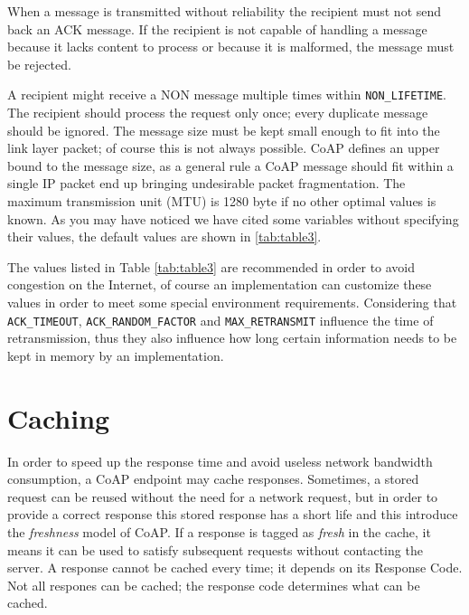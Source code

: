 	When a message is transmitted without reliability the recipient must not send back an ACK message.\newline
	If the recipient is not capable of handling a message because it lacks content to process or because it is malformed, the message must be rejected.\newline
	
	A recipient might receive a NON message multiple times within \texttt{NON\_LIFETIME}.\newline
	The recipient should process the request only once; every duplicate message should be ignored.\newline
	The message size must be kept small enough to fit into the link layer packet; of course this is not always possible.\newline
	CoAP defines an upper bound to the message size, as a general rule a CoAP message should fit within a single IP packet end up bringing undesirable packet fragmentation.\newline
	The maximum transmission unit (MTU) is 1280 byte if no other optimal values is known.\newline
	As you may have noticed we have cited some variables without specifying their values, the default values are shown in \ref{tab:table3}.\newline
	
	

	The values listed in Table \ref{tab:table3} are recommended in order to avoid congestion on the Internet, of course an implementation can customize these values in order to meet some special environment requirements.\newline
	Considering that \texttt{ACK\_TIMEOUT}, \texttt{ACK\_RANDOM\_FACTOR} and \texttt{MAX\_RETRANSMIT} influence the time of retransmission, thus they also influence how long certain information needs to be kept in memory by an implementation.\newline
	
	\section{Caching}\label{sc:caching}
	In order to speed up the response time and avoid useless network bandwidth consumption, a CoAP endpoint may cache responses.\newline
	Sometimes, a stored request can be reused without the need for a network request, but in order to provide a correct response this stored response has a short life and this introduce the \emph{freshness} model of CoAP.\newline
	If a response is tagged as \emph{fresh} in the cache, it means it can be used to satisfy subsequent requests without contacting the server.\newline
	A response cannot be cached every time; it depends on its Response Code.\newline
	Not all respones can be cached; the response code determines what can be cached.
	
